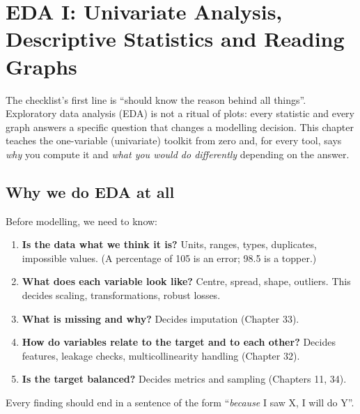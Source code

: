 \chapter{EDA I: Univariate Analysis, Descriptive Statistics and Reading Graphs}

The checklist's first line is ``should know the reason behind all things''. Exploratory data analysis (EDA) is not a ritual of plots: every
statistic and every graph answers a specific question that changes a modelling decision. This chapter teaches the one-variable (univariate)
toolkit from zero and, for every tool, says \emph{why} you compute it and \emph{what you would do differently} depending on the answer.

\section{Why we do EDA at all}
Before modelling, we need to know:
\begin{enumerate}
\item \textbf{Is the data what we think it is?} Units, ranges, types, duplicates, impossible values. (A percentage of 105 is an error; 98.5 is a topper.)
\item \textbf{What does each variable look like?} Centre, spread, shape, outliers. This decides scaling, transformations, robust losses.
\item \textbf{What is missing and why?} Decides imputation (Chapter 33).
\item \textbf{How do variables relate to the target and to each other?} Decides features, leakage checks, multicollinearity handling (Chapter 32).
\item \textbf{Is the target balanced?} Decides metrics and sampling (Chapters 11, 34).
\end{enumerate}
Every finding should end in a sentence of the form ``\emph{because} I saw X, I will do Y''.

